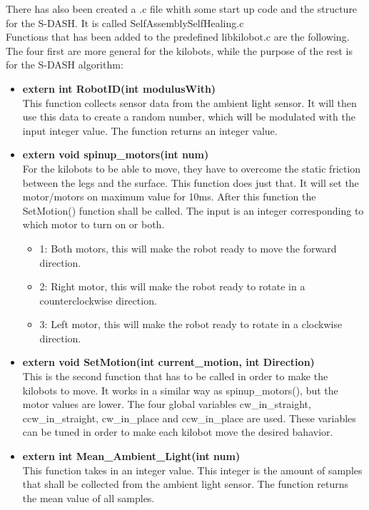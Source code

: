 There has also been created a .c file whith some start up code and the structure for the S-DASH. It is called SelfAssemblySelfHealing.c\\
Functions that has been added to the predefined libkilobot.c are the following.\\
The four first are more general for the kilobots, while the purpose of the rest is for the S-DASH algorithm:
\begin{itemize}
\item \textbf{extern int RobotID(int modulusWith)}\\
This function collects sensor data from the ambient light sensor. It will then use this data to create a random number, which will be modulated with the input integer value. The function returns an integer value.

\item \textbf{extern void spinup\_motors(int num)}\\
For the kilobots to be able to move, they have to overcome the static friction between the legs and the surface. This function does just that. It will set the motor/motors on maximum value for 10ms. After this function the SetMotion() function shall be called. The input is an integer corresponding to which motor to turn on or both.
\begin{itemize}
\item 1: Both motors, this will make the robot ready to move the forward direction.
\item 2: Right motor, this will make the robot ready to rotate in a counterclockwise direction.
\item 3: Left motor, this will make the robot ready to rotate in a clockwise direction.
\end{itemize}

\item \textbf{extern void SetMotion(int current\_motion, int Direction)}\\
This is the second function that has to be called in order to make the kilobots to move. It works in a similar way as spinup\_motors(), but the motor values are lower. The four global variables cw\_in\_straight, ccw\_in\_straight, cw\_in\_place and ccw\_in\_place are used. These variables can be tuned in order to make each kilobot move the desired bahavior.

\item \textbf{extern int Mean\_Ambient\_Light(int num)}\\
This function takes in an integer value. This integer is the amount of samples that shall be collected from the ambient light sensor. The function returns the mean value of all samples.


\end{itemize}
